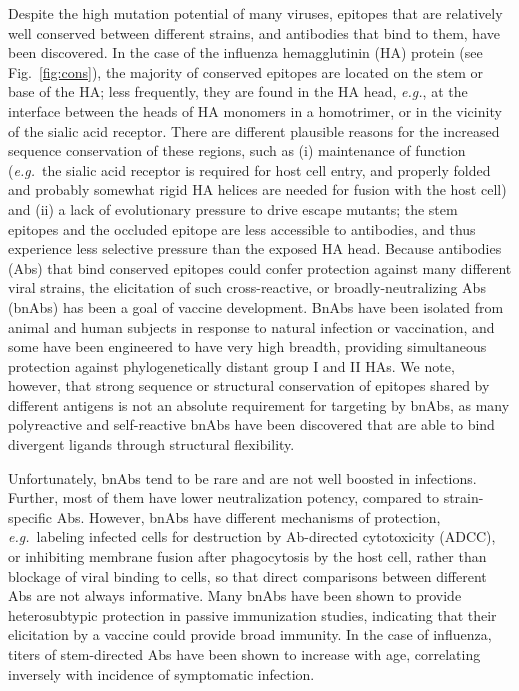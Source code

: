 \documentclass[utf8]{frontiersHLTH}%
\newcommand{\cred}[1]{\textsf{\color{red}#1}}
\def\eg {{\it e.g.}}
\newcommand{\fig}[1]{Fig.~\ref{fig:#1}}
\begin{document}
Despite the high mutation potential of many viruses,
epitopes that are relatively well conserved between different strains, and
antibodies that bind to them, have been discovered. In the case of the
influenza hemagglutinin (HA) protein (see \fig{cons}), 
the majority of conserved epitopes are located
on the stem or base of the HA\cite{nachbagauer17,corti17};
less frequently, they are found in the HA head, \eg,
at the interface between the heads of HA monomers\cite{watanabe19,bajic19}
in a homotrimer, or in the vicinity of the sialic acid receptor\cite{raymond18,bajic19a}.
There are different plausible reasons for the increased sequence
conservation of these regions, such as (i) maintenance of function (\eg~the
sialic acid receptor is required for host cell entry, and properly
folded and probably somewhat rigid HA helices are needed for fusion with the
host cell) and (ii) a lack of evolutionary pressure to drive escape
mutants\cite{raymond18}; the stem epitopes and the occluded epitope\cite{watanabe19}
are less accessible to antibodies, and thus
experience less selective pressure than the exposed HA head.
Because antibodies (Abs) that bind conserved epitopes could confer protection
against many different viral strains, the elicitation of such cross-reactive, or
broadly-neutralizing Abs (bnAbs) has been a goal of vaccine development.\cite{nachbagauer17}
BnAbs have been isolated from animal and human subjects in response
to natural infection or vaccination,\cite{corti17} and some have been engineered\cite{kallewaard16}
to have very high breadth, providing simultaneous protection
against phylogenetically distant group I and II HAs.\cite{corti11,li12,kallewaard16}
%
\cred{We note, however, that strong sequence or structural conservation of epitopes
shared by different antigens is not an absolute requirement for targeting
by bnAbs, as many polyreactive and self-reactive bnAbs have been
discovered that are able to bind divergent ligands through structural flexibility.\cite{prigent18,ovchinnikov18}}

Unfortunately, bnAbs tend to be rare and are not well boosted in
infections\cite{li12,ellebedy14,tan19,arevalo20}.
Further, most of them have lower neutralization potency, compared to strain-specific Abs.
However, bnAbs have
different mechanisms of protection, \eg~labeling infected cells for
destruction by Ab-directed cytotoxicity (ADCC), or inhibiting membrane
fusion after phagocytosis by the host cell,\cite{nachbagauer17} rather than blockage of viral
binding to cells, so that direct comparisons between different Abs are not always
informative.
Many bnAbs have been shown to provide heterosubtypic protection in
passive immunization studies,\cite{corti17} indicating that their elicitation by
a vaccine could provide broad immunity. In the case of
influenza, titers of stem-directed Abs have been shown to increase with
age, correlating inversely with incidence of symptomatic
infection.\cite{Nachbagauer16}
\end{document}
